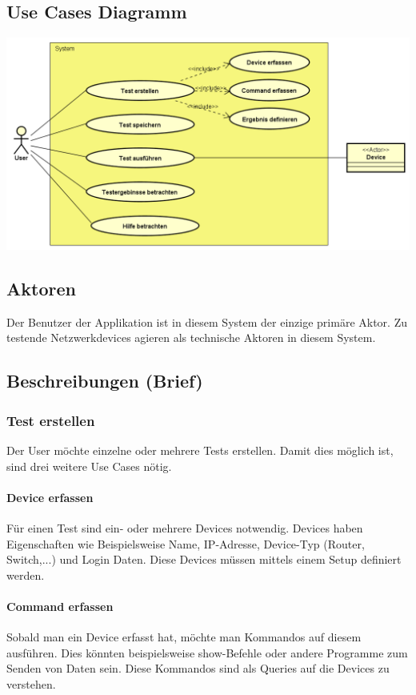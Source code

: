 \documentclass[a4,12pt]{scrartcl}
\begin{document}
\subsection{Use Cases Diagramm}
\includegraphics[scale=0.52]{figures/UseCase_Diagram}
\subsection{Aktoren}
Der Benutzer der Applikation ist in diesem System der einzige primäre Aktor. Zu testende Netzwerkdevices agieren als technische Aktoren in diesem System.
\subsection{Beschreibungen (Brief)}
\subsubsection{Test erstellen}
Der User möchte einzelne oder mehrere Tests erstellen. Damit dies möglich ist, sind drei weitere Use Cases nötig.
\paragraph{Device erfassen}\hfill

\noindent Für einen Test sind ein- oder mehrere Devices notwendig. Devices haben Eigenschaften wie Beispielsweise Name, IP-Adresse, Device-Typ (Router, Switch,...) und Login Daten. Diese Devices müssen mittels einem Setup definiert werden.
\paragraph{Command erfassen}\hfill

\noindent Sobald man ein Device erfasst hat, möchte man Kommandos auf diesem ausführen. Dies könnten beispielsweise show-Befehle oder andere Programme zum Senden von Daten sein. Diese Kommandos sind als Queries auf die Devices zu verstehen.
\end{document}
